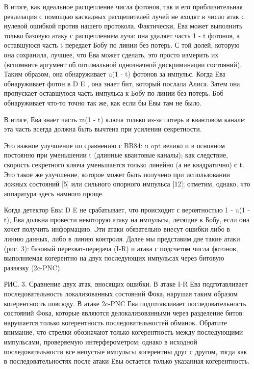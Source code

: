В итоге, как идеальное расщепление числа фотонов, так и его приблизительная реализация с помощью каскадных расщепителей лучей не входят в число атак с нулевой ошибкой против нашего протокола. Фактически, Ева может выполнить только базовую атаку с расщеплением луча: она удаляет часть 1 - t фотонов, а оставшуюся часть t передает Бобу по линии без потерь. С той долей, которую она сохранила, лучшее, что Ева может сделать, это просто измерить их (вспомните аргумент об оптимальной однозначной дискриминации состояний). Таким образом, она обнаруживает u(1 - t) фотонов за импульс. Когда Ева обнаруживает фотон в D E , она знает бит, который послала Алиса. Затем она пропускает оставшуюся часть импульса к Бобу по линии без потерь. Боб обнаруживает что-то точно так же, как если бы Евы там не было.

В итоге, Ева знает часть m(1 - t) ключа только из-за потерь в квантовом канале: эта часть всегда должна быть вычтена при усилении секретности.


Это важное улучшение по сравнению с BB84: u opt велико и в основном постоянно при уменьшении t (длинные квантовые каналы); как следствие, скорость секретного ключа уменьшается только линейно (а не квадратично) с t. Это такое же улучшение, которое может быть получено при использовании ложных состояний [5] или сильного опорного импульса [12]; отметим, однако, что аппаратура здесь намного проще.

Когда детектор Евы D E не срабатывает, что происходит с вероятностью 1 - u(1 - t), Ева должна провести некоторую атаку на импульсы, летящие к Бобу, если она хочет получить информацию. Эти атаки обязательно внесут ошибки либо в линию данных, либо в линию контроля. Далее мы представим две такие атаки (рис. 3): базовый перехват-передача (I-R) и атака с подсчетом числа фотонов, выполняемая когерентно на двух последующих импульсах через битовую развязку (2c-PNC).

РИС. 3. Сравнение двух атак, вносящих ошибки. В атаке I-R Ева подготавливает последовательность локализованных состояний Фока, нарушая таким образом когерентность повсюду. В атаке 2c-PNC Ева подготавливает последовательность состояний Фока, которые являются делокализованными через разделение битов: нарушается только когерентность последовательностей обманок. Обратите внимание, что стрелки обозначают только когерентность между последующими импульсами, проверяемую интерферометром; однако в исходной последовательности все непустые импульсы когерентны друг с другом, тогда как в последовательностях после атаки Евы остается только указанная когерентность.

